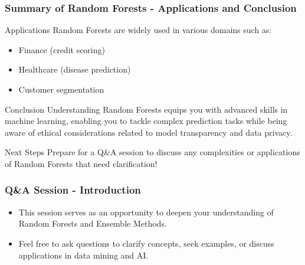 \documentclass[aspectratio=169]{beamer}
\begin{document}
\begin{frame}[fragile]
    \frametitle{Summary of Random Forests - Applications and Conclusion}
    \begin{block}{Applications}
        Random Forests are widely used in various domains such as:
        \begin{itemize}
            \item Finance (credit scoring)
            \item Healthcare (disease prediction)
            \item Customer segmentation
        \end{itemize}
    \end{block}

    \begin{block}{Conclusion}
        Understanding Random Forests equips you with advanced skills in machine learning, enabling you to tackle complex prediction tasks while being aware of ethical considerations related to model transparency and data privacy.
    \end{block}

    \begin{block}{Next Steps}
        Prepare for a Q\&A session to discuss any complexities or applications of Random Forests that need clarification!
    \end{block}
\end{frame}

\begin{frame}[fragile]
  \frametitle{Q\&A Session - Introduction}
  \begin{itemize}
    \item This session serves as an opportunity to deepen your understanding of Random Forests and Ensemble Methods.
    \item Feel free to ask questions to clarify concepts, seek examples, or discuss applications in data mining and AI.
  \end{itemize}
\end{frame}
\end{document}
